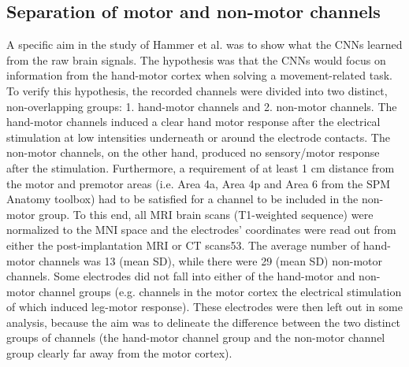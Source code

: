 \subsection{Separation of motor and non-motor channels}\label{subsec:separation-of-motor-and-non-motor-channels}
A specific aim in the study of Hammer et al.\cite{Hammer-2021} was to show what the CNNs learned from the raw brain signals.
The hypothesis was that the CNNs would focus on information from the hand-motor cortex when solving a movement-related task.
To verify this hypothesis, the recorded channels were divided into two distinct, non-overlapping groups: 1. hand-motor channels and 2. non-motor channels.
The hand-motor channels induced a clear hand motor response after the electrical stimulation at low intensities underneath or around the electrode contacts.
The non-motor channels, on the other hand, produced no sensory/motor response after the stimulation.
Furthermore, a requirement of at least 1 cm distance from the motor and premotor areas (i.e. Area 4a, Area 4p and Area 6 from the SPM Anatomy toolbox\cite{eickhoff-new-2005}) had to be satisfied for a channel to be included in the non-motor group.
To this end, all MRI brain scans (T1-weighted sequence) were normalized to the MNI space and the electrodes' coordinates were read out from either the post-implantation MRI or CT scans53.
The average number of hand-motor channels was 13  (mean \pm SD), while there were 29  (mean \pm SD) non-motor channels.
Some electrodes did not fall into either of the hand-motor and non-motor channel groups (e.g. channels in the motor cortex the electrical stimulation of which induced leg-motor response).
These electrodes were then left out in some analysis, because the aim was to delineate the difference between the two distinct groups of channels (the hand-motor channel group and the non-motor channel group clearly far away from the motor cortex).


